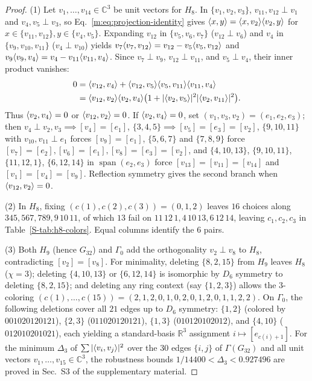 \documentclass[aps,pra,reprint,superscriptaddress,longbibliography,nofootinbib,floatfix,10pt]{revtex4-2}
\theoremstyle{definition}\newtheorem{definition}[theorem]{Definition}
\theoremstyle{remark}\newtheorem{remark}[theorem]{Remark}
\newcommand{\C}{\mathbb C}\newcommand{\R}{\mathbb R}\newcommand{\Q}{\mathbb Q}
\DeclareMathOperator{\spanop}{span}\DeclareMathOperator{\rank}{rank}
\begin{document}
\begin{proof}
(1) Let $v_1,\ldots,v_{14}\in\C^3$ be unit vectors for $H_8$. In $\{v_1,v_2,v_3\}$, $v_{11},v_{12}\perp v_1$ and $v_4,v_5\perp v_3$, so Eq.~\eqref{m:eq:projection-identity} gives $\langle x,y\rangle=\langle x,v_2\rangle\langle v_2,y\rangle$ for $x\in\{v_{11},v_{12}\},y\in\{v_4,v_5\}$. Expanding $v_{12}$ in $\{v_5,v_6,v_7\}$ ($v_{12}\perp v_6$) and $v_4$ in $\{v_9,v_{10},v_{11}\}$ ($v_4\perp v_{10}$) yields $v_7\langle v_7,v_{12}\rangle=v_{12}-v_5\langle v_5,v_{12}\rangle$ and $v_9\langle v_9,v_4\rangle=v_4-v_{11}\langle v_{11},v_4\rangle$. Since $v_7\perp v_9$, $v_{12}\perp v_{11}$, and $v_5\perp v_4$, their inner product vanishes:
\begin{equation}\label{m:eq:coordfree-product}
\begin{aligned}
0={}&\langle v_{12},v_4\rangle
+\langle v_{12},v_5\rangle\langle v_5,v_{11}\rangle\langle v_{11},v_4\rangle\\
={}&\langle v_{12},v_2\rangle\langle v_2,v_4\rangle
\bigl(1+|\langle v_2,v_5\rangle|^2|\langle v_2,v_{11}\rangle|^2\bigr).
\end{aligned}
\end{equation}
Thus $\langle v_2,v_4\rangle=0$ or $\langle v_{12},v_2\rangle=0$. If $\langle v_2,v_4\rangle=0$, set $(v_1,v_3,v_2)=(e_1,e_2,e_3)$; then $v_4\perp v_2,v_3\implies[v_4]=[e_1]$, $\{3,4,5\}\implies[v_5]=[e_3]=[v_2]$, $\{9,10,11\}$ with $v_{10},v_{11}\perp e_1$ forces $[v_9]=[e_1]$, $\{5,6,7\}$ and $\{7,8,9\}$ force $[v_7]=[e_2],[v_6]=[e_1],[v_8]=[e_3]=[v_2]$, and $\{4,10,13\}$, $\{9,10,11\}$, $\{11,12,1\}$, $\{6,12,14\}$ in $\spanop(e_2,e_3)$ force $[v_{13}]=[v_{11}]=[v_{14}]$ and $[v_1]=[v_4]=[v_9]$. Reflection symmetry gives the second branch when $\langle v_{12},v_2\rangle=0$.

(2) In $H_8$, fixing $(c(1),c(2),c(3))=(0,1,2)$ leaves $16$ choices along $345,567,789,9\,10\,11$, of which $13$ fail on $11\,12\,1,4\,10\,13,6\,12\,14$, leaving $c_1,c_2,c_3$ in Table~\ref{S-tab:h8-colors}. Equal columns identify the $6$ pairs.

(3) Both $H_9$ (hence $G_{32}$) and $\Gamma_0$ add the orthogonality $v_2\perp v_8$ to $H_8$, contradicting $[v_2]=[v_8]$. For minimality, deleting $\{8,2,15\}$ from $H_9$ leaves $H_8$ ($\chi=3$); deleting $\{4,10,13\}$ or $\{6,12,14\}$ is isomorphic by $D_6$ symmetry to deleting $\{8,2,15\}$; and deleting any ring context (say $\{1,2,3\}$) allows the $3$-coloring $(c(1),\ldots,c(15))=(2,1,2,0,1,0,2,0,1,2,0,1,1,2,2)$. On $\Gamma_0$, the following deletions cover all $21$ edges up to $D_6$ symmetry: $\{1,2\}$ (colored by $001020120121$), $\{2,3\}$ ($011020120121$), $\{1,3\}$ ($010120102012$), and $\{4,10\}$ ($012010201021$), each yielding a standard-basis $\R^3$ assignment $i\mapsto[e_{c(i)+1}]$. For the minimum $\Delta_3$ of $\sum|\langle v_i,v_j\rangle|^2$ over the $30$ edges $\{i,j\}$ of $\Gamma(G_{32})$ and all unit vectors $v_1,\ldots,v_{15}\in\C^3$, the robustness bounds $1/14400<\Delta_3<0.927496$ are proved in Sec.~S3 of the supplementary material.
\end{proof}
\end{document}
